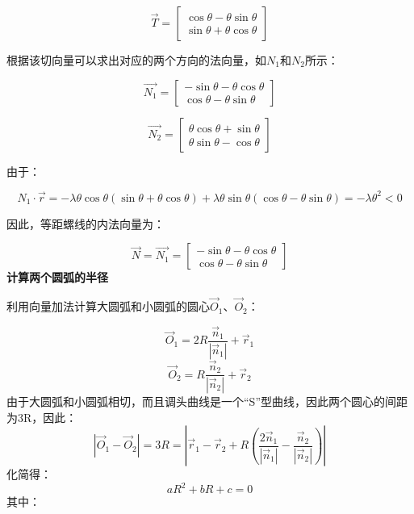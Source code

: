 \documentclass[withoutpreface,bwprint]{cumcmthesis}
\begin{document}
$$
\overrightarrow{T} =\begin{bmatrix}\cos \theta -\theta \sin \theta  \\\sin \theta +\theta \cos \theta \end{bmatrix}
$$

根据该切向量可以求出对应的两个方向的法向量，如$N_1$和$N_2$所示：

$$
\overrightarrow{N_{1} } =\begin{bmatrix}-\sin \theta -\theta \cos \theta  \\\cos \theta -\theta \sin \theta \end{bmatrix}
$$

$$
\overrightarrow{N_{2} } =\begin{bmatrix}\theta \cos \theta +\sin \theta  \\\theta \sin \theta - \cos \theta \end{bmatrix}
$$

由于：

$$
N_{1} \cdot \overrightarrow{r} =-\lambda \theta \cos \theta \left ( \sin \theta +\theta \cos \theta  \right )+\lambda \theta \sin \theta \left ( \cos \theta -\theta \sin \theta  \right ) =-\lambda \theta ^{2}< 0  
$$

因此，等距螺线的内法向量为：

$$
\overrightarrow{N} =\overrightarrow{N_{1} } =\begin{bmatrix}-\sin \theta -\theta \cos \theta  \\\cos \theta -\theta \sin \theta \end{bmatrix}
$$
\textbf{计算两个圆弧的半径}

利用向量加法计算大圆弧和小圆弧的圆心$\overrightarrow{O } _{1}$、$\overrightarrow{O } _{2}$：

$$
\overrightarrow{O } _{1}= 2R\frac{\overrightarrow{n} _{1} }{\left | \overrightarrow{n} _{1} \right | }+\overrightarrow{r} _{1} 
$$
$$
\overrightarrow{O } _{2}= R\frac{\overrightarrow{n} _{2} }{\left | \overrightarrow{n} _{2} \right | }+\overrightarrow{r} _{2} 
$$
由于大圆弧和小圆弧相切，而且调头曲线是一个“S”型曲线，因此两个圆心的间距为3R，因此：
$$
\left |\overrightarrow{O } _{1}-\overrightarrow{O } _{2}\right |=3R= \left |\overrightarrow{r} _{1}-\overrightarrow{r} _{2}+ R\left ( \frac{2\overrightarrow{n} _{1} }{\left | \overrightarrow{n} _{1} \right | }-\frac{\overrightarrow{n} _{2} }{\left | \overrightarrow{n} _{2} \right | } \right )   \right | 
$$
化简得：
$$
aR^{2} +bR+c=0
$$
其中：
\end{document}
